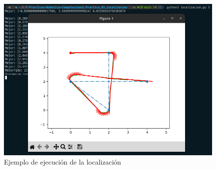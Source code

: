 \documentclass[11pt]{report}
\begin{document}
\begin{figure}[H]
  \centering
  \includegraphics[scale=0.42]{img/localizacion_1.png}
  \caption{Ejemplo de ejecución de la localización}
\end{figure}
\end{document}
